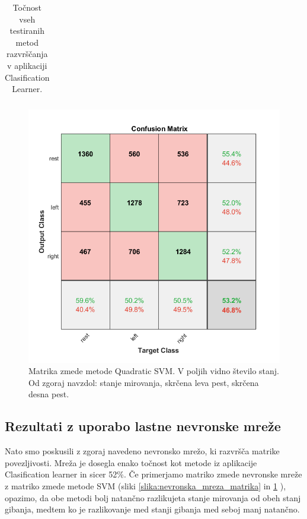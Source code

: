 \begin{table}
\begin{tabular}{|l|l|c|}
\hline
\end{tabular}
\caption{Točnost vseh testiranih metod razvrščanja v aplikaciji Clasification Learner.}
\label{tabela:primerjava_tocnosti}
\end{table}

\begin{figure}
    \begin{center}
    \includegraphics[width=0.8\linewidth]{slike/ConfusionSVM.png}
    \end{center}
    \caption[Matrika zmede metode Quadratic SVM.]{Matrika zmede metode Quadratic SVM. V poljih vidno število stanj. Od zgoraj navzdol: stanje mirovanja, skrčena leva pest, skrčena desna pest.}
    \label{slika:SVM_matrika}
    \end{figure}

\subsection{Rezultati z uporabo lastne nevronske mreže}
Nato smo poskusili z zgoraj navedeno nevronsko mrežo, ki razvršča matrike povezljivosti. Mreža je dosegla enako točnost kot metode iz aplikacije Clasification learner in sicer 52\%. Če primerjamo matriko zmede nevronske mreže z matriko zmede metode SVM (sliki \ref{slika:nevronska_mreza_matrika} in \ref{slika:SVM_matrika} ), opazimo, da obe metodi bolj natančno razlikujeta stanje mirovanja od obeh stanj gibanja, medtem ko je razlikovanje med stanji gibanja med seboj manj natančno.

